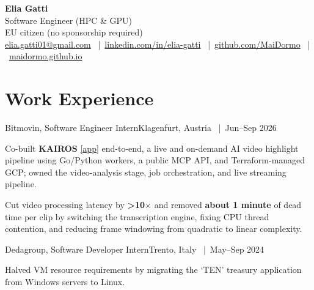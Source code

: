 
\newcommand{\cvheadline}{Software Engineer (HPC \& GPU)}


\pagestyle{empty}
\color{maintext}
\raggedright
{}

\begin{center}
{\Huge\textbf{Elia Gatti}}\\[6pt]
{\large\cvheadline}\\[4pt]
{\small EU citizen (no sponsorship required)}\\[3pt]
{\small
\href{mailto:elia.gatti01@gmail.com}{elia.gatti01@gmail.com} \ |\ 
\href{https://www.linkedin.com/in/elia-gatti/}{linkedin.com/in/elia-gatti} \ |\ 
\href{https://github.com/MaiDormo}{github.com/MaiDormo} \ |\ 
\href{https://maidormo.github.io/}{maidormo.github.io}
}
\end{center}

\section{Work Experience}
\begin{joblong}{Bitmovin, Software Engineer Intern}{Klagenfurt, Austria \ |\ Jun--Sep 2026}
    \item Co-built \textbf{KAIROS} \href{https://kairosapp.tech}{\footnotesize [app]} end-to-end, a live and on-demand AI video highlight pipeline using Go/Python workers, a public MCP API, and Terraform-managed GCP; owned the video-analysis stage, job orchestration, and live streaming pipeline.
    \item Cut video processing latency by \textbf{>10$\times$} and removed \textbf{about 1 minute} of dead time per clip by switching the transcription engine, fixing CPU thread contention, and reducing frame windowing from quadratic to linear complexity.
\end{joblong}

\begin{joblong}{Dedagroup, Software Developer Intern}{Trento, Italy \ |\ May--Sep 2024}
    \item Halved VM resource requirements by migrating the `TEN' treasury application from Windows servers to Linux.
\end{joblong}

